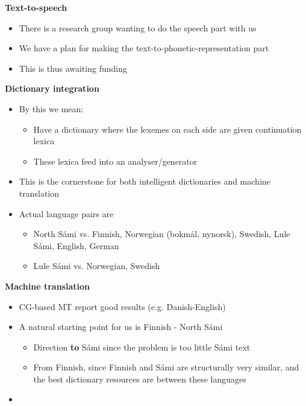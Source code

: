 \documentclass[landscape,english,11pt]{seminar}
\begin{document}
\begin{slide}
\newslide
\textbf{Text-to-speech}
\begin{itemize}
\item There is a research group wanting to do the speech part with us
\item We have a plan for making the text-to-phonetic-representation part
\item This is thus awaiting funding
\end{itemize}

\newslide
\textbf{Dictionary integration}
\begin{itemize}
\item By this we mean:
\begin{itemize}
\item Have a dictionary where the lexemes on each side are given continuation lexica
\item These lexica feed into an analyser/generator
\end{itemize}
\item This is the cornerstone for both intelligent dictionaries and machine translation
\item Actual language pairs are
\begin{itemize}
\item North Sámi vs. Finnish, Norwegian (bokmål, nynorsk), Swedish, Lule Sámi, English, German
\item Lule Sámi vs. Norwegian, Swedish
\end{itemize}

\end{itemize}

\newslide
\textbf{Machine translation}
\begin{itemize}
\item CG-based MT report good results (e.g. Danish-English)
\item A natural starting point for us is Finnish - North Sámi
\begin{itemize}
\item Direction \textbf{to} Sámi since the problem is too little Sámi text
\item From Finnish, since Finnish and Sámi are structurally very similar, and the best dictionary resources are between these languages
\end{itemize}
\end{itemize}


\newslide
\textbf{}
\begin{itemize}
\item
\end{itemize}




\end{slide}
\end{document}
